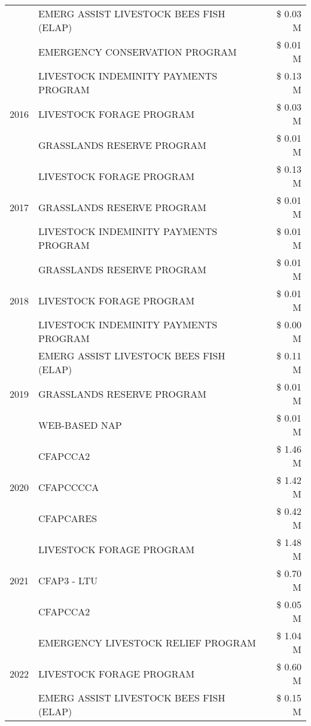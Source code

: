 \begin{tabular}{llr}
 & EMERG ASSIST LIVESTOCK BEES FISH (ELAP) & \$ 0.03 M \\
 & EMERGENCY CONSERVATION PROGRAM & \$ 0.01 M \\
\cline{1-3}
\multirow[t]{3}{*}{2016} & LIVESTOCK INDEMINITY PAYMENTS PROGRAM & \$ 0.13 M \\
 & LIVESTOCK FORAGE PROGRAM & \$ 0.03 M \\
 & GRASSLANDS RESERVE PROGRAM & \$ 0.01 M \\
\cline{1-3}
\multirow[t]{3}{*}{2017} & LIVESTOCK FORAGE PROGRAM & \$ 0.13 M \\
 & GRASSLANDS RESERVE PROGRAM & \$ 0.01 M \\
 & LIVESTOCK INDEMINITY PAYMENTS PROGRAM & \$ 0.01 M \\
\cline{1-3}
\multirow[t]{3}{*}{2018} & GRASSLANDS RESERVE PROGRAM & \$ 0.01 M \\
 & LIVESTOCK FORAGE PROGRAM & \$ 0.01 M \\
 & LIVESTOCK INDEMINITY PAYMENTS PROGRAM & \$ 0.00 M \\
\cline{1-3}
\multirow[t]{3}{*}{2019} & EMERG ASSIST LIVESTOCK BEES FISH (ELAP) & \$ 0.11 M \\
 & GRASSLANDS RESERVE PROGRAM & \$ 0.01 M \\
 & WEB-BASED NAP & \$ 0.01 M \\
\cline{1-3}
\multirow[t]{3}{*}{2020} & CFAPCCA2 & \$ 1.46 M \\
 & CFAPCCCCA & \$ 1.42 M \\
 & CFAPCARES & \$ 0.42 M \\
\cline{1-3}
\multirow[t]{3}{*}{2021} & LIVESTOCK FORAGE PROGRAM & \$ 1.48 M \\
 & CFAP3 - LTU & \$ 0.70 M \\
 & CFAPCCA2 & \$ 0.05 M \\
\cline{1-3}
\multirow[t]{3}{*}{2022} & EMERGENCY LIVESTOCK RELIEF PROGRAM & \$ 1.04 M \\
 & LIVESTOCK FORAGE PROGRAM & \$ 0.60 M \\
 & EMERG ASSIST LIVESTOCK BEES FISH (ELAP) & \$ 0.15 M \\
\cline{1-3}
\bottomrule
\end{tabular}
